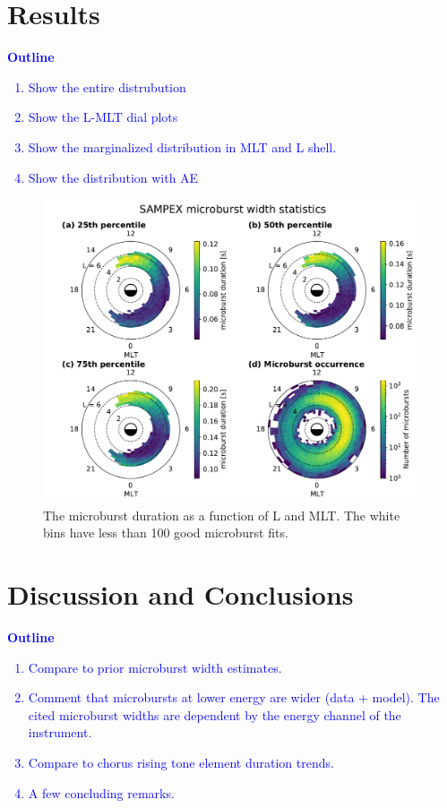 \documentclass[draft]{agujournal2019}
\begin{document}
\section{Results}\label{results}
\textcolor{blue}{
\textbf{Outline}
\begin{enumerate}
    \item Show the entire distrubution
    \item Show the L-MLT dial plots
    \item Show the marginalized distribution in MLT and L shell.
    \item Show the distribution with AE
\end{enumerate}
}

\begin{figure}
\noindent\includegraphics[width=\textwidth]{figures/fig2.pdf}
\caption{The microburst duration as a function of L and MLT. The white bins have less than 100 good microburst fits.}
\label{fig2}
\end{figure}

\section{Discussion and Conclusions}\label{discussion}
\textcolor{blue}{
\textbf{Outline}
\begin{enumerate}
    \item Compare to prior microburst width estimates.
    \item Comment that microbursts at lower energy are wider (data + model). The cited microburst widths are dependent by the energy channel of the instrument. 
    \item Compare to chorus rising tone element duration trends.
    \item A few concluding remarks.
\end{enumerate}
}
\end{document}
